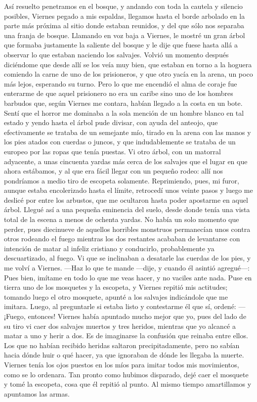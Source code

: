 \documentclass{novela}
\begin{document}
    Así resuelto penetramos en el bosque, y andando con toda la cautela y silencio posibles, Viernes pegado a mis espaldas, llegamos hasta el borde arbolado en la parte más próxima al sitio donde estaban reunidos, y del que sólo nos separaba una franja de bosque. Llamando en voz baja a Viernes, le mostré un gran árbol que formaba justamente la saliente del bosque y le dije que fuese hasta allá a observar lo que estaban naciendo los salvajes. Volvió un momento después diciéndome que desde allí se los veía muy bien, que estaban en torno a la hoguera comiendo la carne de uno de los prisioneros, y que otro yacía en la arena, un poco más lejos, esperando su turno. Pero lo que me encendió el alma de coraje fue enterarme de que aquel prisionero no era un caribe sino uno de los hombres barbudos que, según Viernes me contara, habían llegado a la costa en un bote. Sentí que el horror me dominaba a la sola mención de un hombre blanco en tal estado y yendo hasta el árbol pude divisar, con ayuda del anteojo, que efectivamente se trataba de un semejante mío, tirado en la arena con las manos y los pies atados con cuerdas o juncos, y que indudablemente se trataba de un europeo por las ropas que tenía puestas.
    Vi otro árbol, con un matorral adyacente, a unas cincuenta yardas más cerca de los salvajes que el lugar en que ahora estábamos, y al que era fácil llegar con un pequeño rodeo: allí nos pondríamos a medio tiro de escopeta solamente. Reprimiendo, pues, mi furor, aunque estaba encolerizado hasta el límite, retrocedí unos veinte pasos y luego me deslicé por entre los arbustos, que me ocultaron hasta poder apostarme en aquel árbol. Llegué así a una pequeña eminencia del suelo, desde donde tenía una vista total de la escena a menos de ochenta yardas.
    No había un solo momento que perder, pues diecinueve de aquellos horribles monstruos permanecían unos contra otros rodeando el fuego mientras los dos restantes acababan de levantarse con intención de matar al infeliz cristiano y conducirlo, probablemente ya descuartizado, al fuego. Vi que se inclinaban a desatarle las cuerdas de los pies, y me volví a Viernes.
    —Haz lo que te mande —dije, y cuando él asintió agregué—: Pues bien, imítame en todo lo que me veas hacer, y no vaciles ante nada.
    Puse en tierra uno de los mosquetes y la escopeta, y Viernes repitió mis actitudes; tomando luego el otro mosquete, apunté a los salvajes indicándole que me imitara. Luego, al preguntarle si estaba listo y contestarme él que sí, ordené:
    — ¡Fuego, entonces!
    Viernes había apuntado mucho mejor que yo, pues del lado de su tiro vi caer dos salvajes muertos y tres heridos, mientras que yo alcancé a matar a uno y herir a dos. Es de imaginarse la confusión que reinaba entre ellos. Los que no habían recibido heridas saltaron precipitadamente, pero no sabían hacia dónde huir o qué hacer, ya que ignoraban de dónde les llegaba la muerte. Viernes tenía los ojos puestos en los míos para imitar todos mis movimientos, como se lo ordenara. Tan pronto como hubimos disparado, dejé caer el mosquete y tomé la escopeta, cosa que él repitió al punto. Al mismo tiempo amartillamos y apuntamos las armas.
\end{document}
